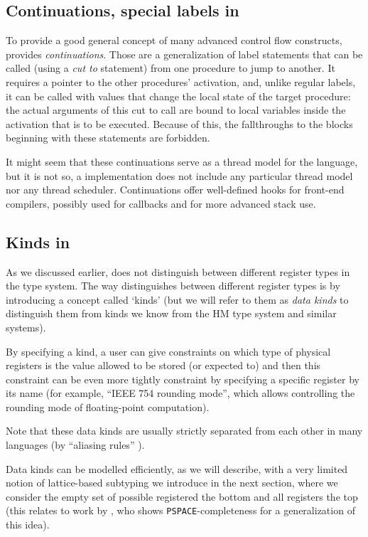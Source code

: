 \subsection{Continuations, special labels in \cmm}

To provide a good general concept of many advanced control flow constructs, \cmm provides \emph{continuations}. Those are a generalization of label statements that can be called (using a \emph{cut to} statement) from one procedure to jump to another. It requires a pointer to the other procedures' activation, and, unlike regular labels, it can be called with values that change the local state of the target procedure: the actual arguments of this cut to call are bound to local variables inside the activation that is to be executed. Because of this, the fallthroughs to the blocks beginning with these statements are forbidden.

It might seem that these continuations serve as a thread model for the language, but it is not so, a \cmm implementation does not include any particular thread model nor any thread scheduler. Continuations offer well-defined hooks for front-end compilers, possibly used for callbacks and for more advanced stack use. \cite{ramsey2005c}

\subsection{Kinds in \cmm}

As we discussed earlier, \cmm does not distinguish between different register types in the type system. The way \cmm distinguishes between different register types is by introducing a concept called `kinds' (but we will refer to them as \emph{data kinds} to distinguish them from kinds we know from the HM type system and similar systems).

By specifying a kind, a user can give constraints on which type of physical registers is the value allowed to be stored (or expected to) and then this constraint can be even more tightly constraint by specifying a specific register by its name (for example, ``IEEE 754 rounding mode'', which allows controlling the rounding mode of floating-point computation).

Note that these data kinds are usually strictly separated from each other in many languages (by ``aliasing rules'' \cite{cstandard2018}).

Data kinds can be modelled efficiently, as we will describe, with a very limited notion of lattice-based subtyping we introduce in the next section, where we consider the empty set of possible registered the bottom and all registers the top (this relates to work by \citet{tiuryn1999subtyping}, who shows \texttt{PSPACE}-completeness for a generalization of this idea).

